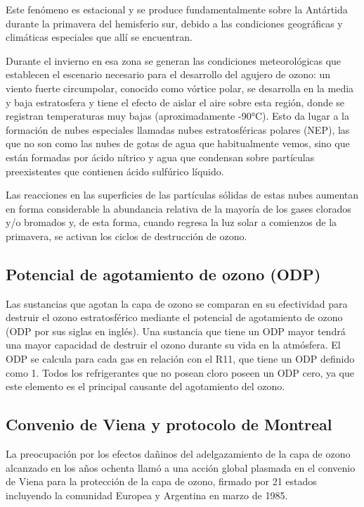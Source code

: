 	Este fenómeno es estacional y se produce fundamentalmente sobre la Antártida durante la primavera del hemisferio sur, debido a las condiciones geográficas y climáticas especiales que allí se encuentran.

	Durante el invierno en esa zona se generan las condiciones meteorológicas que establecen el escenario necesario para el desarrollo del agujero de ozono: un viento fuerte circumpolar, conocido como vórtice polar, se desarrolla en la media y baja estratosfera y tiene el efecto de aislar el aire sobre esta región, donde se registran temperaturas muy bajas (aproximadamente -90°C). Esto da lugar a la formación de nubes especiales llamadas nubes estratosféricas polares (NEP), las que no son como las nubes de gotas de agua que habitualmente vemos, sino que están formadas por ácido nítrico y agua que condensan sobre partículas preexistentes que contienen ácido sulfúrico líquido. 

	Las reacciones en las superficies de las partículas sólidas de estas nubes aumentan en forma considerable la abundancia relativa de la mayoría de los gases clorados y/o bromados y, de esta forma, cuando regresa la luz solar a comienzos de la primavera, se activan los ciclos de destrucción de ozono.

	\subsection{Potencial de agotamiento de ozono (ODP)}

	Las sustancias que agotan la capa de ozono se comparan en su efectividad para destruir el ozono estratosférico mediante el potencial de agotamiento de ozono (ODP por sus siglas en inglés). Una sustancia que tiene un ODP mayor tendrá una mayor capacidad de destruir el ozono durante su vida en la atmósfera. El ODP se calcula para cada gas en relación con el R11, que tiene un ODP definido como 1. Todos los refrigerantes que no posean cloro poseen un ODP cero, ya que este elemento es el principal causante del agotamiento del ozono.

	\subsection{Convenio de Viena y protocolo de Montreal}

	La preocupación por los efectos dañinos del adelgazamiento de la capa de ozono alcanzado en los años ochenta llamó a una acción global plasmada en el convenio de Viena para la protección de la capa de ozono, firmado por 21 estados incluyendo la comunidad Europea y Argentina en marzo de 1985.

